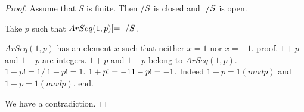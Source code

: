 \documentclass{article}
\begin{document}
\begin{forthel}
\begin{proof}
      Assume that $S$ is finite. Then $\-/ S$ is closed and $~ \-/ S$ is open.

      Take $p$ such that $ArSeq(1,p) [= ~ \-/ S$.

      $ArSeq(1,p)$ has an element $x$ such that neither $x = 1$ nor $x = -1$.
      proof.
        $1 + p$ and $1 - p$ are integers.
        $1 + p$ and $1 - p$ belong to $ArSeq(1,p)$. $1 + p !=  1 /\ 1 - p !=  1$. $1 + p != -1 \/ 1 - p != -1$.
        Indeed $1 + p = 1 (mod p)$ and $1 - p = 1 (mod p)$.
      end.

      We have a contradiction.
    \end{proof}
  \end{forthel}
\end{document}
